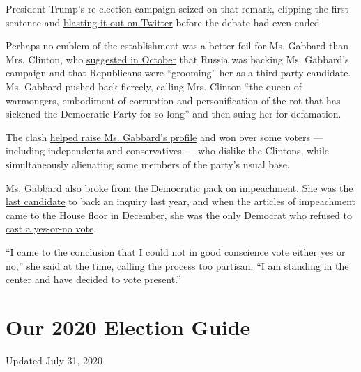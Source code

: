 President Trump's re-election campaign seized on that remark, clipping
the first sentence and
\href{https://twitter.com/TrumpWarRoom/status/1197342010191036416}{blasting
it out on Twitter} before the debate had even ended.

Perhaps no emblem of the establishment was a better foil for Ms. Gabbard
than Mrs. Clinton, who
\href{https://www.nytimes.com/2019/10/18/us/politics/tulsi-gabbard-hillary-clinton-russia.html}{suggested
in October} that Russia was backing Ms. Gabbard's campaign and that
Republicans were ``grooming'' her as a third-party candidate. Ms.
Gabbard pushed back fiercely, calling Mrs. Clinton ``the queen of
warmongers, embodiment of corruption and personification of the rot that
has sickened the Democratic Party for so long'' and then suing her for
defamation.

The clash
\href{https://www.nytimes.com/2019/11/18/us/politics/tulsi-gabbard-clinton-new-hampshire.html}{helped
raise Ms. Gabbard's profile} and won over some voters --- including
independents and conservatives --- who dislike the Clintons, while
simultaneously alienating some members of the party's usual base.

Ms. Gabbard also broke from the Democratic pack on impeachment. She
\href{https://www.nytimes.com/2019/09/27/us/politics/tulsi-gabbard-impeachment.html}{was
the last candidate} to back an inquiry last year, and when the articles
of impeachment came to the House floor in December, she was the only
Democrat
\href{https://www.nytimes.com/2019/12/18/us/elections/tulsi-gabbard-impeachment-vote.html}{who
refused to cast a yes-or-no vote}.

``I came to the conclusion that I could not in good conscience vote
either yes or no,'' she said at the time, calling the process too
partisan. ``I am standing in the center and have decided to vote
present.''

\hypertarget{our-2020-election-guide}{%
\section{Our 2020 Election Guide}\label{our-2020-election-guide}}

Updated July 31, 2020

